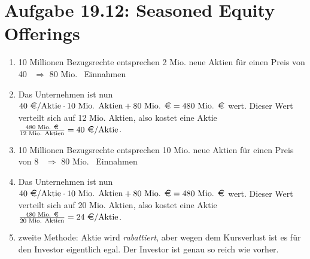 \documentclass{article}
\begin{document}
	\section*{Aufgabe 19.12: Seasoned Equity Offerings}
	\begin{enumerate}[label=(\alph*)]
		\item 10 Millionen Bezugsrechte entsprechen 2 Mio. neue Aktien für einen Preis von 40 \EUR\, $\Rightarrow$ 80 Mio. \EUR\, Einnahmen
		\item Das Unternehmen ist nun $40\text{ \EUR/Aktie}\cdot 10\text{ Mio. Aktien} + 80\text{ Mio. \EUR} = 480\text{ Mio. \EUR}$ wert. Dieser Wert verteilt sich auf 12 Mio. Aktien, also kostet eine Aktie $\frac{480\text{ Mio. \EUR}}{12\text{ Mio. Aktien}} = 40\text{ \EUR/Aktie}$.
		\item 10 Millionen Bezugsrechte entsprechen 10 Mio. neue Aktien für einen Preis von 8 \EUR\, $\Rightarrow$ 80 Mio. \EUR\, Einnahmen
		\item Das Unternehmen ist nun $40\text{ \EUR/Aktie}\cdot 10\text{ Mio. Aktien} + 80\text{ Mio. \EUR} = 480\text{ Mio. \EUR}$ wert. Dieser Wert verteilt sich auf 20 Mio. Aktien, also kostet eine Aktie $\frac{480\text{ Mio. \EUR}}{20\text{ Mio. Aktien}} = 24\text{ \EUR/Aktie}$.
		\item zweite Methode: Aktie wird \textit{rabattiert}, aber wegen dem Kursverlust ist es für den Investor eigentlich egal. Der Investor ist genau so reich wie vorher.
	\end{enumerate}
\end{document}
